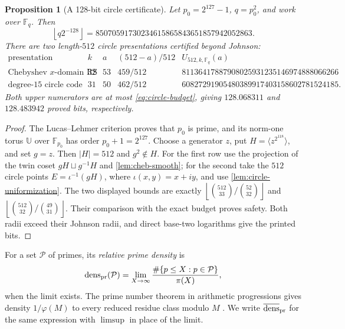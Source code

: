 \documentclass[11pt,a4paper]{amsart}
\numberwithin{equation}{section}
\newtheorem{proposition}[proposition]{Proposition}
\theoremstyle{remark}
\newcommand{\F}{\mathbb F}
\newcommand{\Pcal}{\mathcal P}
\newcommand{\UU}{\mathbb U}
\newcommand{\abs}[1]{\lvert #1\rvert}
\newcommand{\floor}[1]{\left\lfloor #1\right\rfloor}
\begin{document}
\begin{proposition}[A 128-bit circle certificate]
\label{prop:paving-circle-certificate}
Let \(p_0=2^{127}-1\), \(q=p_0^2\), and work over \(\F_q\).  Then
\[
 \floor{q2^{-128}}
 =85070591730234615865843651857942052863.          \tag{CP1}
 \label{eq:circle-budget}
\]
There are two length-\(512\) circle presentations certified beyond
Johnson:
{\small
\[
\begin{array}{c|c|c|c|c}
\text{presentation}&k&a&(512-a)/512&
 U_{512,k,\F_q}(a)\\ \hline
\text{Chebyshev \(x\)-domain RS}&32&53&459/512&
81136417887908025931235146974888066266\\
\text{degree-\(15\) circle code}&31&50&462/512&
60827291905480389917403158602781524185 .
\end{array}                                       \tag{CP2}
 \label{eq:circle-paving-rows}
\]
}
Both upper numerators are at most \eqref{eq:circle-budget}, giving
\(128.068311\) and \(128.483942\) proved bits, respectively.
\end{proposition}

\begin{proof}
The Lucas--Lehmer criterion \cite[Sec.~4.2]{Riesel} proves that \(p_0\) is
prime, and its norm-one
torus \(\UU\) over \(\F_{p_0}\) has order \(p_0+1=2^{127}\).  Choose a
generator \(z\), put \(H=\langle z^{2^{118}}\rangle\), and set \(g=z\).
Then \(\abs H=512\) and \(g^2\notin H\).  For the first row use the
projection of the twin coset \(gH\sqcup g^{-1}H\) and
\cref{lem:cheb-smooth}; for the second take the \(512\) circle points
\(E=\iota^{-1}(gH)\), where \(\iota(x,y)=x+iy\), and use
\cref{lem:circle-uniformization}.  The two displayed
bounds are exactly
\(\floor{\binom{512}{33}/\binom{52}{32}}\) and
\(\floor{\binom{512}{32}/\binom{49}{31}}\).
Their comparison with the exact budget proves safety.  Both radii exceed
their Johnson radii, and direct base-two logarithms give the printed bits.
\end{proof}

For a set \(\Pcal\) of primes, its \emph{relative prime density} is
\[
\operatorname{dens}_{\rm pr}(\Pcal)=
 \lim_{X\to\infty}\frac{\#\{p\le X:p\in\Pcal\}}{\pi(X)},
\]
when the limit exists.  The prime number theorem in arithmetic
progressions gives density \(1/\varphi(M)\) to every reduced residue
class modulo \(M\) \cite{Davenport}.
We write \(\overline{\operatorname{dens}}_{\rm pr}\) for the same
expression with \(\limsup\) in place of the limit.
\end{document}
